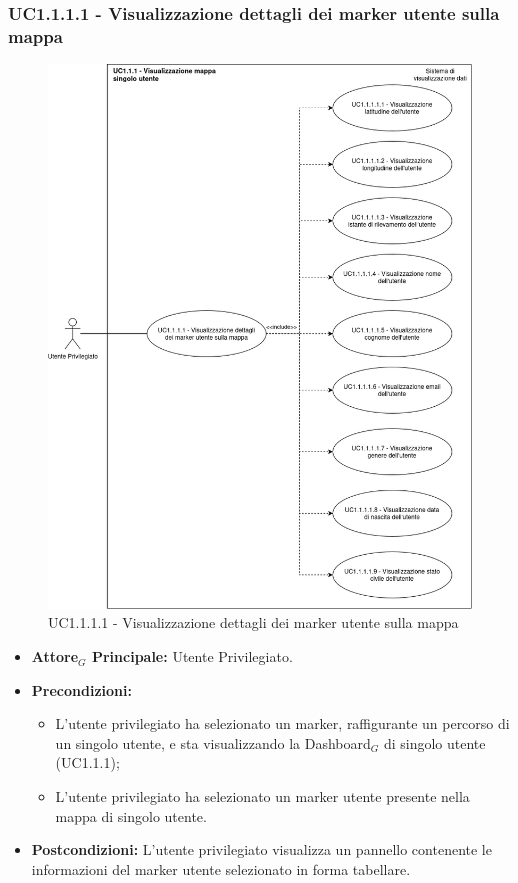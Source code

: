 \documentclass[11pt]{article}
\begin{document}
\begin{justify}
\subsubsection{\textbf{UC1.1.1.1 - Visualizzazione dettagli dei marker utente sulla mappa}}
\begin{figure}[H]
    \centering
    \includegraphics[width=0.7\linewidth]{UC1.1.1.1imageNew.png}
    \caption{UC1.1.1.1 - Visualizzazione dettagli dei marker utente sulla mappa}
    \label{fig:UC1.1.1.1}
\end{figure}
\label{UC1.1.1.1}
\begin{itemize}
     \item \textbf{Attore$_G$ Principale:} Utente Privilegiato.
     \item \textbf{Precondizioni:}
        \begin{itemize}
        \item L'utente privilegiato ha selezionato un marker, raffigurante un percorso di un singolo utente, e sta visualizzando la Dashboard$_G$ di singolo utente (UC1.1.1);
          \item L'utente privilegiato ha selezionato un marker utente presente nella mappa di singolo utente.
        \end{itemize}
      \item \textbf{Postcondizioni:} L'utente privilegiato visualizza un pannello contenente le informazioni del marker utente selezionato in forma tabellare. 

\end{itemize}
\end{justify}
\end{document}

